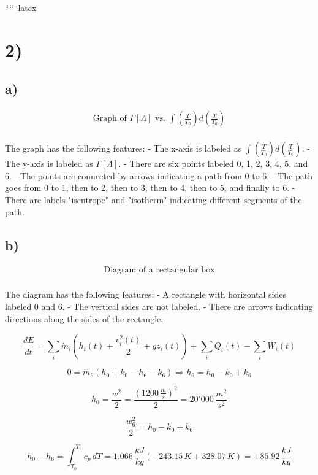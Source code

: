 
``````latex


\section*{2)}

\subsection*{a)}

\[
\begin{array}{c}
\text{Graph of } \Gamma [\Lambda] \text{ vs. } \int \left( \frac{T}{T_0} \right) d\left( \frac{T}{T_0} \right) \\
\end{array}
\]

\noindent
The graph has the following features:
- The x-axis is labeled as $\int \left( \frac{T}{T_0} \right) d\left( \frac{T}{T_0} \right)$.
- The y-axis is labeled as $\Gamma [\Lambda]$.
- There are six points labeled 0, 1, 2, 3, 4, 5, and 6.
- The points are connected by arrows indicating a path from 0 to 6.
- The path goes from 0 to 1, then to 2, then to 3, then to 4, then to 5, and finally to 6.
- There are labels "isentrope" and "isotherm" indicating different segments of the path.

\subsection*{b)}

\[
\begin{array}{c}
\text{Diagram of a rectangular box} \\
\end{array}
\]

\noindent
The diagram has the following features:
- A rectangle with horizontal sides labeled 0 and 6.
- The vertical sides are not labeled.
- There are arrows indicating directions along the sides of the rectangle.

\[
\frac{dE}{dt} = \sum_{i} \dot{m}_i \left( h_i(t) + \frac{v_i^2(t)}{2} + gz_i(t) \right) + \sum_{i} \dot{Q}_i(t) - \sum_{i} \dot{W}_i(t)
\]

\[
0 = \dot{m}_6 (h_0 + k_0 - h_6 - k_6) \Rightarrow h_6 = h_0 - k_0 + k_6
\]

\[
h_0 = \frac{w^2}{2} = \frac{(1200 \, \frac{m}{s})^2}{2} = 20'000 \, \frac{m^2}{s^2}
\]

\[
\frac{w_6^2}{2} = h_0 - k_0 + k_6
\]

\[
h_0 - h_6 = \int_{T_0}^{T_6} c_p \, dT = 1.066 \, \frac{kJ}{kg} \left( -243.15 \, K + 328.07 \, K \right) = +85.92 \, \frac{kJ}{kg}
\]

